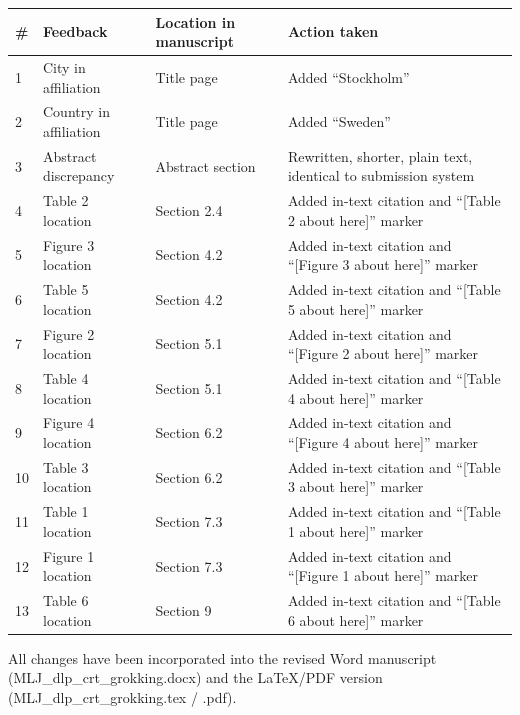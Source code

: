 \documentclass[11pt,a4paper]{article}
\begin{document}
\begin{table}[h]
\centering
\begin{tabular}{p{0.5cm}p{4cm}p{4cm}p{4cm}}
\toprule
\textbf{\#} & \textbf{Feedback} & \textbf{Location in manuscript} & \textbf{Action taken} \\
\midrule
1 & City in affiliation & Title page & Added ``Stockholm'' \\
2 & Country in affiliation & Title page & Added ``Sweden'' \\
3 & Abstract discrepancy & Abstract section & Rewritten, shorter, plain text, identical to submission system \\
4 & Table 2 location & Section 2.4 & Added in-text citation and ``[Table 2 about here]'' marker \\
5 & Figure 3 location & Section 4.2 & Added in-text citation and ``[Figure 3 about here]'' marker \\
6 & Table 5 location & Section 4.2 & Added in-text citation and ``[Table 5 about here]'' marker \\
7 & Figure 2 location & Section 5.1 & Added in-text citation and ``[Figure 2 about here]'' marker \\
8 & Table 4 location & Section 5.1 & Added in-text citation and ``[Table 4 about here]'' marker \\
9 & Figure 4 location & Section 6.2 & Added in-text citation and ``[Figure 4 about here]'' marker \\
10 & Table 3 location & Section 6.2 & Added in-text citation and ``[Table 3 about here]'' marker \\
11 & Table 1 location & Section 7.3 & Added in-text citation and ``[Table 1 about here]'' marker \\
12 & Figure 1 location & Section 7.3 & Added in-text citation and ``[Figure 1 about here]'' marker \\
13 & Table 6 location & Section 9 & Added in-text citation and ``[Table 6 about here]'' marker \\
\bottomrule
\end{tabular}
\end{table}

All changes have been incorporated into the revised Word manuscript (MLJ\_dlp\_crt\_grokking.docx) and the LaTeX/PDF version (MLJ\_dlp\_crt\_grokking.tex / .pdf).
\end{document}

